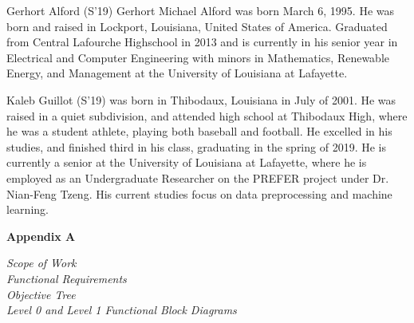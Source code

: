 \documentclass[conference]{IEEEtran}
\begin{document}
\newpage
\begin{IEEEbiography}
    {Gerhort Alford}
    (S'19) Gerhort Michael Alford was born March 6, 1995. He was born and raised in Lockport, Louisiana, United States of America. Graduated from Central Lafourche Highschool in 2013 and is currently in his senior year in Electrical and Computer Engineering with minors in Mathematics, Renewable Energy, and Management at the University of Louisiana at Lafayette.
    \vspace{-40mm}
\end{IEEEbiography}
\vspace{-100mm}
\begin{IEEEbiography}{Kaleb Guillot}
(S'19) was born in Thibodaux, Louisiana in July of 2001. He was raised in a quiet subdivision, and attended high school at Thibodaux High, where he was a student athlete, playing both baseball and football. He excelled in his studies, and finished third in his class, graduating in the spring of 2019. He is currently a senior at the University of Louisiana at Lafayette, where he is employed as an Undergraduate Researcher on the PREFER project under Dr. Nian-Feng Tzeng. His current studies focus on data preprocessing and machine learning. 
\end{IEEEbiography}
\vspace{12pt}

\renewcommand{\appendixname}{Appendices}
\let\appendix\relax
\appendix

\clearpage
\onecolumn
\begin{center}
    \vspace*{4.5cm}
     {\Huge\bfseries Appendix A \par}
     \vspace{1cm}
    \textit{Scope of Work} \\
    \textit{Functional Requirements} \\
    \textit{Objective Tree} \\
    \textit{Level 0 and Level 1 Functional Block Diagrams}
\end{center}
\end{document}
